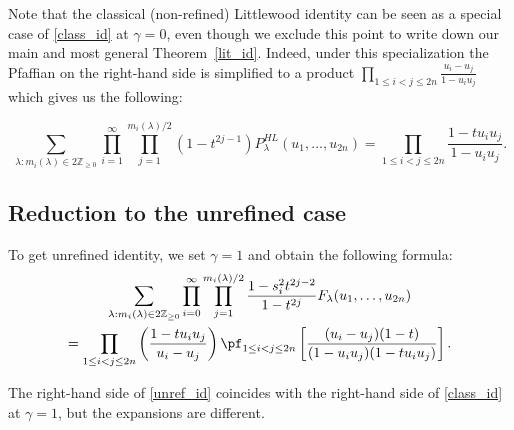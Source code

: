 Note that the classical (non-refined) Littlewood identity can be seen as a special case of \eqref{class_id} at $\gamma = 0$, even though we exclude this point to write down our main and most general Theorem~\ref{lit_id}. Indeed, under this specialization the Pfaffian on the right-hand side is simplified to a product 
$\prod_{1 \leq i<j \leq 2n} \frac{ u_i - u_j}
{1-u_i u_j}$ which gives us the following:

\begin{equation*}
\sum_{\lambda: m_{i}(\lambda) \in 2 \mathbb{Z}_{\geq 0}}  \prod_{i = 1}^{\infty} \prod_{j = 1}^{m_{i}(\lambda) / 2} (1 - t^{2j-1}) P_{\lambda}^{HL} (u_1,\ldots,u_{2n})
=
\prod_{1 \leq i<j \leq 2n}
\frac{1-t u_i u_j}{1 - u_i u_j} .
\end{equation*}

\subsection{Reduction to the unrefined case}
To get unrefined identity, we set $\gamma = 1$ and obtain the following formula:
\begin{multline} \label{unref_id}
\sum_{\lambda: m_{i}(\lambda) \in 2 \mathbb{Z}_{\geq 0}}   \prod_{i = 0}^{\infty} \prod_{j = 1}^{m_{i}(\lambda) / 2} \frac{1 - s_{i}^2 t^{2j - 2}}{1 - t^{2j}} F_{\lambda} (u_1, \dots, u_{2n})
\\
=
\prod_{1 \leq i<j \leq 2n}
\left(
\frac{1-t u_i u_j}{u_i - u_j}
\right) 
\pf_{1\leq i < j \leq 2n}
\left[
\frac{ (u_i - u_j)(1 - t) }
{(1-u_i u_j) (1-t u_i u_j)}
\right].
\end{multline}

The right-hand side of \eqref{unref_id} coincides with the right-hand side of \eqref{class_id} at $\gamma = 1$, but the expansions are different.

